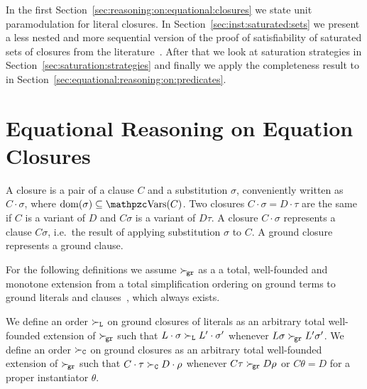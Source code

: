 In the first Section~\vref{sec:reasoning:on:equational:closures}
we state unit paramodulation for literal closures.
In Section~\vref{sec:inst:saturated:sets} we present
a less nested and more sequential version of the proof of satisfiability
of saturated sets of closures
from the literature~\cite{GK2004csl}.
After that we look at saturation strategies in
Section~\vref{sec:saturation:strategies}
and finally we apply the completeness result to \InstGenEQ{}
in Section~\vref{sec:equational:reasoning:on:predicates}.



\section{Equational Reasoning on Equation Closures}\label{sec:reasoning:on:equational:closures}

\begin{definition}
    A closure is a pair of a clause \( C \) and a substitution \( \sigma \),
    conveniently written as \( C\cdot\sigma \), where \( \domain(\sigma) \subseteq \var(C)\). 
    Two closures \( C\cdot\sigma = D\cdot\tau \)
    are the same if \( C \) is a variant of \( D \) and \( C\sigma \) is a variant of \( D\tau \).
    A closure \( C\cdot\sigma \) represents a clause \( C\sigma \),
    i.e.~the result of applying substitution \( \sigma \) to \( C \).
    A ground closure represents a ground clause.
\end{definition}

For the following definitions we assume
\( \mathrel\succ_{\!\mathtt{gr}} \) as a a total, well-founded and monotone extension
from a total simplification ordering on ground terms
to ground literals and clauses~\cite{NR2001},
which always exists.


\begin{definition}
    We define an order \( \mathrel\succ_{\mathtt{L}} \) on ground closures of literals
    as an arbitrary total well-founded extension of \( \mathrel\succ_{\!\mathtt{gr}} \)
    such that
    \( L\cdot\sigma\mathrel\succ_{\mathtt{L}} L'\cdot\sigma' \) whenever
    \( L\sigma\mathrel\succ_{\!\mathtt{gr}} L'\sigma' \).
% 
    We define an order \( \mathrel\succ_{\mathtt{C}} \) on ground closures
    as an arbitrary total well-founded extension of
    \( \mathrel\succ_{\!\mathtt{gr}} \)
    such that
    \( C\cdot\tau\mathrel\succ_{\mathtt{C}} D\cdot\rho \) whenever
    \( C\tau\mathrel\succ_{\!\mathtt{gr}} D\rho \) or \( C\theta = D \) for a proper instantiator \( \theta \).
\end{definition}


